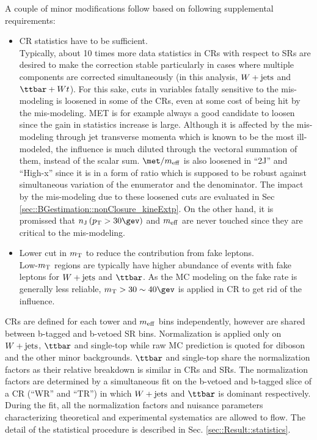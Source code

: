 A couple of minor modifications follow based on following supplemental requirements:
\begin{itemize}
\item CR statistics have to be sufficient. \\
Typically, about 10 times more data statistics in CRs with respect to SRs are desired to make the correction stable particularly in cases where multiple components are corrected simultaneously (in this analysis, $W+\mathrm{jets}$ and $\ttbar+Wt$). 
For this sake, cuts in variables fatally sensitive to the mis-modeling is loosened in some of the CRs, even at some cost of being hit by the mis-modeling.
MET is for example always a good candidate to loosen since the gain in statistics increase is large.
Although it is affected by the mis-modeling through jet transverse momenta which is known to be the most ill-modeled, 
the influence is much diluted through the vectoral summation of them, instead of the scalar sum. 
$\metOverMeff$ is also loosened in ``2J'' and ``High-x'' since it is in a form of ratio which is supposed to be robust against simultaneous variation of the enumerator and the denominator.
The impact by the mis-modeling due to these loosened cuts are evaluated in Sec \ref{sec::BGestimation::nonClosure_kineExtp}.
On the other hand, it is promissed that $\nJet$ and $m_{\mathrm{eff}}$ are never touched since they are critical to the mis-modeling. \\
%
\item Lower cut in $m_{\mathrm{T}}$ to reduce the contribution from fake leptons. \\
Low-$m_{\mathrm{T}}$ regions are typically have higher abundance of events with fake leptons for $W+\mathrm{jets}$ and $\ttbar$.
As the MC modeling on the fake rate is generally less reliable, $\mt > 30 \sim 40 \gev$ is applied in CR to get rid of the influence. 
\end{itemize}

CRs are defined for each tower and $m_{\mathrm{eff}}$ bins independently, however are shared between b-tagged and b-vetoed SR bins.  Normalization is applied only on $W+\mathrm{jets}$, $\ttbar$ and single-top while raw MC prediction is quoted for diboson and the other minor backgrounds. $\ttbar$ and single-top share the normalization factors as their relative breakdown is similar in CRs and SRs. 
The normalization factors are determined by a simultaneous fit on the b-vetoed and b-tagged slice of a CR (``WR'' and ``TR'') in which $W+\mathrm{jets}$ and $\ttbar$ is dominant respectively. During the fit, all the normalization factors and nuisance parameters characterizing theoretical and experimental systematics are allowed to flow. The detail of the statistical procedure is described in Sec. \ref{sec::Result::statistics}. \\

